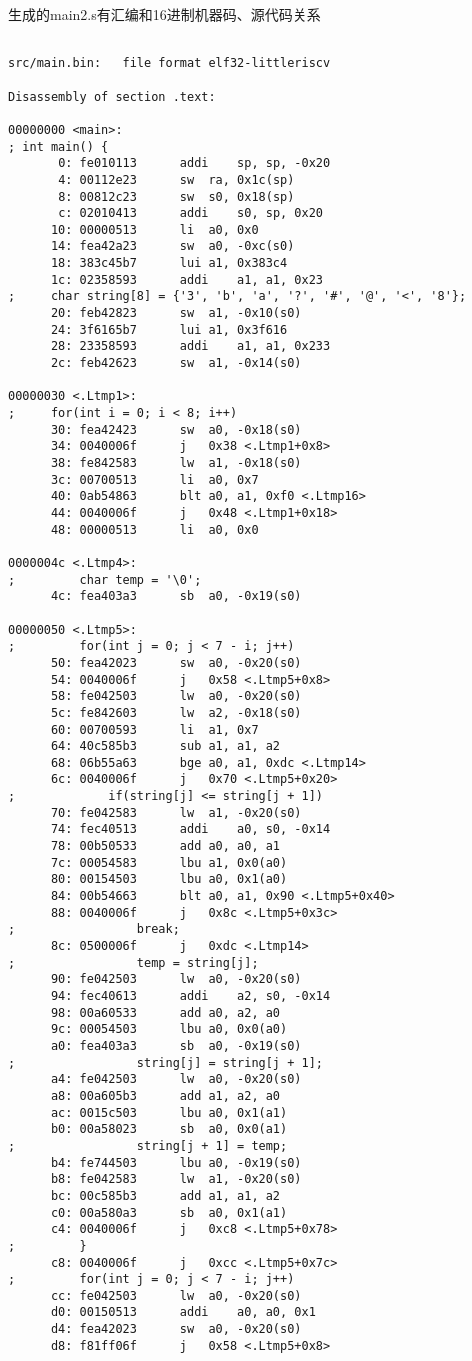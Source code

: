 \documentclass{ctexart}
\begin{document}
生成的main2.s有汇编和16进制机器码、源代码关系
\begin{verbatim}

src/main.bin:	file format elf32-littleriscv

Disassembly of section .text:

00000000 <main>:
; int main() {
       0: fe010113     	addi	sp, sp, -0x20
       4: 00112e23     	sw	ra, 0x1c(sp)
       8: 00812c23     	sw	s0, 0x18(sp)
       c: 02010413     	addi	s0, sp, 0x20
      10: 00000513     	li	a0, 0x0
      14: fea42a23     	sw	a0, -0xc(s0)
      18: 383c45b7     	lui	a1, 0x383c4
      1c: 02358593     	addi	a1, a1, 0x23
;     char string[8] = {'3', 'b', 'a', '?', '#', '@', '<', '8'};
      20: feb42823     	sw	a1, -0x10(s0)
      24: 3f6165b7     	lui	a1, 0x3f616
      28: 23358593     	addi	a1, a1, 0x233
      2c: feb42623     	sw	a1, -0x14(s0)

00000030 <.Ltmp1>:
;     for(int i = 0; i < 8; i++)
      30: fea42423     	sw	a0, -0x18(s0)
      34: 0040006f     	j	0x38 <.Ltmp1+0x8>
      38: fe842583     	lw	a1, -0x18(s0)
      3c: 00700513     	li	a0, 0x7
      40: 0ab54863     	blt	a0, a1, 0xf0 <.Ltmp16>
      44: 0040006f     	j	0x48 <.Ltmp1+0x18>
      48: 00000513     	li	a0, 0x0

0000004c <.Ltmp4>:
;         char temp = '\0';
      4c: fea403a3     	sb	a0, -0x19(s0)

00000050 <.Ltmp5>:
;         for(int j = 0; j < 7 - i; j++)
      50: fea42023     	sw	a0, -0x20(s0)
      54: 0040006f     	j	0x58 <.Ltmp5+0x8>
      58: fe042503     	lw	a0, -0x20(s0)
      5c: fe842603     	lw	a2, -0x18(s0)
      60: 00700593     	li	a1, 0x7
      64: 40c585b3     	sub	a1, a1, a2
      68: 06b55a63     	bge	a0, a1, 0xdc <.Ltmp14>
      6c: 0040006f     	j	0x70 <.Ltmp5+0x20>
;             if(string[j] <= string[j + 1])
      70: fe042583     	lw	a1, -0x20(s0)
      74: fec40513     	addi	a0, s0, -0x14
      78: 00b50533     	add	a0, a0, a1
      7c: 00054583     	lbu	a1, 0x0(a0)
      80: 00154503     	lbu	a0, 0x1(a0)
      84: 00b54663     	blt	a0, a1, 0x90 <.Ltmp5+0x40>
      88: 0040006f     	j	0x8c <.Ltmp5+0x3c>
;                 break;
      8c: 0500006f     	j	0xdc <.Ltmp14>
;                 temp = string[j];
      90: fe042503     	lw	a0, -0x20(s0)
      94: fec40613     	addi	a2, s0, -0x14
      98: 00a60533     	add	a0, a2, a0
      9c: 00054503     	lbu	a0, 0x0(a0)
      a0: fea403a3     	sb	a0, -0x19(s0)
;                 string[j] = string[j + 1];
      a4: fe042503     	lw	a0, -0x20(s0)
      a8: 00a605b3     	add	a1, a2, a0
      ac: 0015c503     	lbu	a0, 0x1(a1)
      b0: 00a58023     	sb	a0, 0x0(a1)
;                 string[j + 1] = temp;
      b4: fe744503     	lbu	a0, -0x19(s0)
      b8: fe042583     	lw	a1, -0x20(s0)
      bc: 00c585b3     	add	a1, a1, a2
      c0: 00a580a3     	sb	a0, 0x1(a1)
      c4: 0040006f     	j	0xc8 <.Ltmp5+0x78>
;         }
      c8: 0040006f     	j	0xcc <.Ltmp5+0x7c>
;         for(int j = 0; j < 7 - i; j++)
      cc: fe042503     	lw	a0, -0x20(s0)
      d0: 00150513     	addi	a0, a0, 0x1
      d4: fea42023     	sw	a0, -0x20(s0)
      d8: f81ff06f     	j	0x58 <.Ltmp5+0x8>


\end{verbatim}
\end{document}
